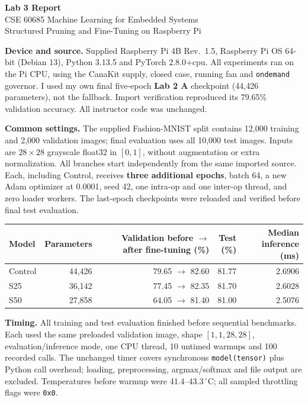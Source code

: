 \documentclass[11pt,letterpaper]{article}
\begin{document}
\begin{center}
{\Large\bfseries Lab 3 Report}\\[4pt]
CSE 60685 Machine Learning for Embedded Systems\\[2pt]
Structured Pruning and Fine-Tuning on Raspberry Pi
\end{center}

\textbf{Device and source.} Supplied Raspberry Pi 4B Rev.\ 1.5, Raspberry Pi OS 64-bit (Debian 13), Python 3.13.5 and PyTorch 2.8.0+cpu. All experiments ran on the Pi CPU, using the CanaKit supply, closed case, running fan and \texttt{ondemand} governor. I used my own final five-epoch \textbf{Lab 2 A} checkpoint (44,426 parameters), not the fallback. Import verification reproduced its 79.65\% validation accuracy. All instructor code was unchanged.

\textbf{Common settings.} The supplied Fashion-MNIST split contains 12,000 training and 2,000 validation images; final evaluation uses all 10,000 test images. Inputs are $28\times28$ grayscale float32 in $[0,1]$, without augmentation or extra normalization. All branches start independently from the same imported source. Each, including Control, receives \textbf{three additional epochs}, batch 64, a new Adam optimizer at 0.0001, seed 42, one intra-op and one inter-op thread, and zero loader workers. The last-epoch checkpoints were reloaded and verified before final test evaluation.

\begin{center}
\begin{tabular}{lrrrr}
\toprule
Model & Parameters & \shortstack{Validation before $\rightarrow$ after\\fine-tuning (\%)} & \shortstack{Test\\(\%)} & \shortstack{Median inference\\(ms)}\\
\midrule
Control & 44,426 & 79.65 $\rightarrow$ 82.60 & 81.77 & 2.6906 \\
S25 & 36,142 & 77.45 $\rightarrow$ 82.35 & 81.70 & 2.6028 \\
S50 & 27,858 & 64.05 $\rightarrow$ 81.40 & 81.00 & 2.5076 \\
\bottomrule
\end{tabular}
\end{center}

\textbf{Timing.} All training and test evaluation finished before sequential benchmarks. Each used the same preloaded validation image, shape $[1,1,28,28]$, evaluation/inference mode, one CPU thread, 10 untimed warmups and 100 recorded calls. The unchanged timer covers synchronous \texttt{model(tensor)} plus Python call overhead; loading, preprocessing, argmax/softmax and file output are excluded. Temperatures before warmup were 41.4--43.3\,$^{\circ}$C; all sampled throttling flags were \texttt{0x0}.
\end{document}
